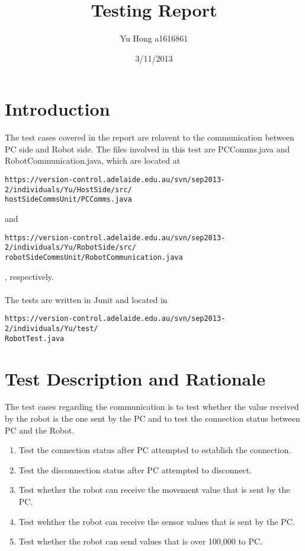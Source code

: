\documentclass[a4paper]{article}
\begin{document}
\title{Testing Report}
\author{Yu Hong a1616861}

\date{3/11/2013}
\maketitle
\section{Introduction}
The test cases covered in the report are relavent to the communication between PC side and Robot side. The files involved in this test are PCComms.java and RobotCommunication.java, which are located at
\begin{verbatim}
https://version-control.adelaide.edu.au/svn/sep2013-2/individuals/Yu/HostSide/src/
hostSideCommsUnit/PCComms.java
\end{verbatim}
and
\begin{verbatim}
https://version-control.adelaide.edu.au/svn/sep2013-2/individuals/Yu/RobotSide/src/
robotSideCommsUnit/RobotCommunication.java
\end{verbatim}
, respectively. 
\\
\\
\noindent
The tests are written in Junit and located in
\begin{verbatim}
https://version-control.adelaide.edu.au/svn/sep2013-2/individuals/Yu/test/
RobotTest.java
\end{verbatim}


\section{Test Description and Rationale}
The test cases regarding the communication is to test whether the value received by the robot is the one sent by the PC and to test the connection status between PC and the Robot.
\begin{enumerate}
\item Test the connection status after PC attempted to establish the connection.
\item Test the disconnection status after PC attempted to disconnect.
\item Test whether the robot can receive the movement value that is sent by the PC.
\item Test wehther the robot can receive the sensor values that is sent by the PC.
\item Test whether the robot can send values that is over 100,000 to PC. 
\end{enumerate}
\end{document}
